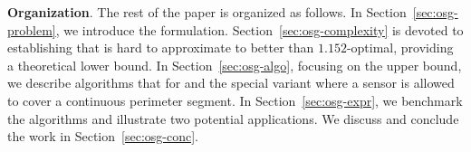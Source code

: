 

\textbf{Organization}. The rest of the paper is organized as follows. 
In Section~\ref{sec:osg-problem}, we introduce the \osgt formulation. 
Section~\ref{sec:osg-complexity} is devoted to establishing that \osgt is 
hard to approximate to better than $1.152$-optimal, providing a theoretical
lower bound. In Section~\ref{sec:osg-algo}, focusing on the upper bound, 
we describe algorithms that for \osgt and the special \opgt variant 
where a sensor is allowed to cover a continuous perimeter segment.
In Section~\ref{sec:osg-expr}, we benchmark the algorithms and illustrate two 
potential applications. We discuss and conclude the work in Section~\ref{sec:osg-conc}.




